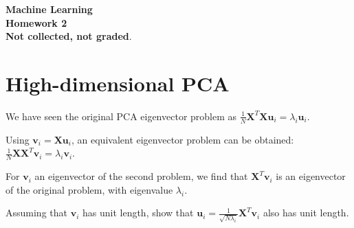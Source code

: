 \documentclass[11pt,noanswers,addpoints]{exam}
\newcommand{\X}{\mathbf X}
\renewcommand{\u}{\mathbf u}
\renewcommand{\v}{\mathbf v}
\begin{document}
{\Large{\textbf{Machine Learning}}} \\[2mm]
\textbf{\Huge{Homework 2}}\\[2mm]


\textbf{Not collected, not graded}.


\section{High-dimensional PCA}
We have seen the original PCA eigenvector problem as $\frac{1}{N}\X^T\X\u_i = \lambda_i\u_i$.

Using $\v_i = \X\u_i$, an equivalent eigenvector problem can be obtained: $\frac{1}{N}\X\X^T\v_i=\lambda_i\v_i$.

For $\v_i$ an eigenvector of the second problem, we find that $\X^T\v_i$ is an eigenvector of the original problem, with eigenvalue $\lambda_i$. 
\begin{questions}
\question Assuming that $\v_i$ has unit length, show that $\u_i=\frac{1}{\sqrt{N\lambda_i}}\X^T\v_i$ also has unit length.
\end{questions}
\end{document}
